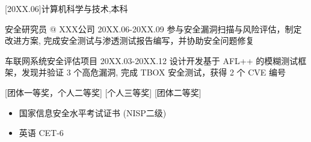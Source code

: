\documentclass[zh]{resume}
\begin{document}
\makeheader


\begin{educations}
  [20XX.06]{计算机科学与技术,本科}
\end{educations}

\begin{projects}
  \project
    {安全研究员 @ XXX公司}
    {20XX.06-20XX.09}
    {
        {参与安全漏洞扫描与风险评估，制定改进方案},
        {完成安全测试与渗透测试报告编写，并协助安全问题修复}
    }
\end{projects}

\begin{projects}
    \project
    {车联网系统安全评估项目}
    {20XX.03-20XX.12}
	{
		{设计开发基于 AFL++ 的模糊测试框架，发现并验证 3 个高危漏洞}, 
		{完成 TBOX 安全测试，获得 2 个 CVE 编号}
	}
\end{projects}

\begin{hornors}
	[团体一等奖，个人二等奖]
  [个人三等奖]
  [团体二等奖]
\end{hornors}

\begin{itemize}
	\item 国家信息安全水平考试证书 (NISP二级)
	\item 英语 CET-6
\end{itemize}
\end{document}
